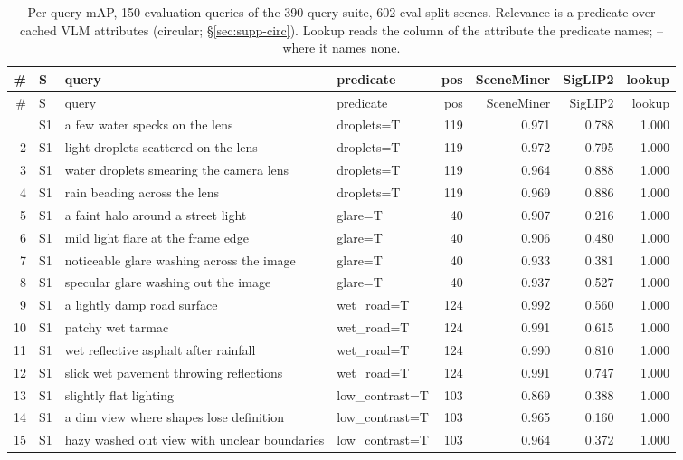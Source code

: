 \begin{longtable}{r l p{5.0cm} p{3.4cm} r r r r}
\caption{Per-query mAP, 150 evaluation queries of the 390-query suite, 602 eval-split scenes. Relevance is a predicate over cached VLM attributes (circular; \S\ref{sec:supp-circ}). Lookup reads the column of the attribute the predicate names; -- where it names none.}\label{tab:pq-suite}\\
\toprule
\# & S & query & predicate & pos & SceneMiner & SigLIP2 & lookup\\
\midrule
\endfirsthead
\toprule
\# & S & query & predicate & pos & SceneMiner & SigLIP2 & lookup\\
\midrule
\endhead
\bottomrule
\endfoot
1 & S1 & a few water specks on the lens & droplets=T & 119 & 0.971 & 0.788 & 1.000\\
2 & S1 & light droplets scattered on the lens & droplets=T & 119 & 0.972 & 0.795 & 1.000\\
3 & S1 & water droplets smearing the camera lens & droplets=T & 119 & 0.964 & 0.888 & 1.000\\
4 & S1 & rain beading across the lens & droplets=T & 119 & 0.969 & 0.886 & 1.000\\
5 & S1 & a faint halo around a street light & glare=T & 40 & 0.907 & 0.216 & 1.000\\
6 & S1 & mild light flare at the frame edge & glare=T & 40 & 0.906 & 0.480 & 1.000\\
7 & S1 & noticeable glare washing across the image & glare=T & 40 & 0.933 & 0.381 & 1.000\\
8 & S1 & specular glare washing out the image & glare=T & 40 & 0.937 & 0.527 & 1.000\\
9 & S1 & a lightly damp road surface & wet\_road=T & 124 & 0.992 & 0.560 & 1.000\\
10 & S1 & patchy wet tarmac & wet\_road=T & 124 & 0.991 & 0.615 & 1.000\\
11 & S1 & wet reflective asphalt after rainfall & wet\_road=T & 124 & 0.990 & 0.810 & 1.000\\
12 & S1 & slick wet pavement throwing reflections & wet\_road=T & 124 & 0.991 & 0.747 & 1.000\\
13 & S1 & slightly flat lighting & low\_contrast=T & 103 & 0.869 & 0.388 & 1.000\\
14 & S1 & a dim view where shapes lose definition & low\_contrast=T & 103 & 0.965 & 0.160 & 1.000\\
15 & S1 & hazy washed out view with unclear boundaries & low\_contrast=T & 103 & 0.964 & 0.372 & 1.000\\

\end{longtable}
